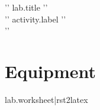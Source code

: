 \documentclass{article}
\begin{document}
\begin{center}
\LARGE{{ '{' }}{{ lab.title }}{{ '}' }} \\[5mm]
\small{{ '{' }} {{ activity.label }}{{ '}' }} \\[2mm]
\small{{ '{' }}}
\end{center}

\section{Equipment}


{{ lab.worksheet|rst2latex }}
\end{document}
